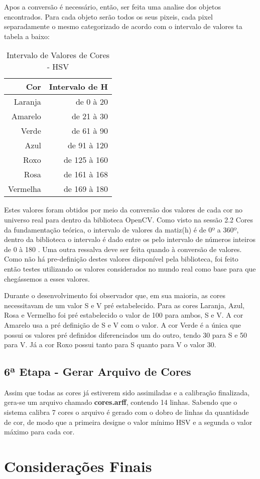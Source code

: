 Apos a conversão é necessário, então, ser feita uma analise dos objetos encontrados. Para cada objeto serão todos os seus pixeis, cada pixel separadamente o mesmo categorizado de acordo com o intervalo de valores ta tabela a baixo:

\begin{table}[H]
\centering
\begin{tabular}{r|r}
Cor & Intervalo de H \\ %
\hline                               %
Laranja & de 0 à 20 \\
\hline 
Amarelo & de 21 à 30\\
\hline 
Verde & de 61 à 90 \\
\hline 
Azul& de 91 à 120 \\
\hline 
Roxo & de 125 à 160 \\
\hline 
Rosa & de 161 à 168 \\
\hline 
Vermelha & de 169 à 180 \\
\hline 
\end{tabular}
\caption{Intervalo de Valores de Cores - HSV}
\end{table}

Estes valores foram obtidos por meio da conversão dos valores de cada cor no universo real para dentro da biblioteca OpenCV. Como visto na sessão 2.2 Cores da fundamentação teórica, o intervalo de valores da matiz(h) é de 0º a 360º, dentro da biblioteca o intervalo é dado entre os pelo intervalo de números inteiros de 0 à 180 . Uma outra ressalva deve ser feita quando à conversão de valores. Como não há pre-definição destes valores disponível pela biblioteca, foi feito então testes utilizando os valores considerados no mundo real como base para que chegássemos a esses valores.

Durante o desenvolvimento foi observador que, em sua maioria, as cores necessitavam de um valor S e V pré estabelecido. Para as cores Laranja, Azul, Rosa e Vermelho foi pré estabelecido o valor de 100 para ambos, S e V. A cor Amarelo usa a pré definição de S e V com o valor. A cor Verde é a única que possui os valores pré definidos diferenciados um do outro, tendo 30 para S e 50 para V. Já a cor Roxo possui tanto para S quanto para V o valor 30.

  \subsection{6ª Etapa - Gerar Arquivo de Cores}
  Assim que todas as cores já estiverem sido assimiladas e a calibração finalizada, gera-se um arquivo chamado \textbf{cores.arff}, contendo 14 linhas. Sabendo que o sistema calibra 7 cores o arquivo é gerado com o dobro de linhas da quantidade de cor, de modo que a primeira designe o valor mínimo HSV e a segunda o valor máximo para cada cor.

\section{Considerações Finais}